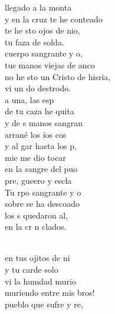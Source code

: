 \documentclass[12pt]{article}
\begin{document}
\begin{multicols*}{2}
\begin{cancion}%
	llegado a la monta\\
	y en la cruz te he conteado\\
	te he sto ojos de nio,\\
	tu faza de solda.\\
\jump
	cuerpo sangrante y o,\\
	tus manos viejas de anco\\
	no he sto un Cristo de hisria,\\
	vi un do destrodo.\\
\jump
	 a una, las esp\\
	de tu caza he quita\\
	y de s manos sangran\\
	arrané los íos cos\\
	y al gar hasta los p,\\
	mie me dio tocar\\
	en la sangre del puo\\
	pre, gueero y escla\\
\jump
	Tu rpo sangrante y o\\
	sobre  se ha descoado\\
	los s quedaron al, \\
	en la cr n clados.\\\jump\\
	\begin{chorus}%
	en tus ojitos de ni\\
	y tu carde solo\\
	vi la humdad murio\\
	muriendo entre mis bros!\\
	 pueblo que sufre y re,\\

\end{chorus}
\end{cancion}
\end{multicols*}
\end{document}
